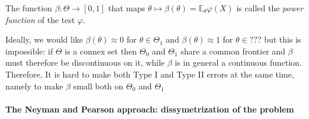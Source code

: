\documentclass[
	fontsize=11pt, %
	twoside=false, %
	numbers=noenddot, %
]{kaobook}
\newcommand{\E}{\mathbb E}
\newcommand{\goes}{\rightarrow}
\begin{document}
The function $\beta : \Theta \goes [0, 1]$ that maps $\theta \mapsto \beta(\theta) = \E_\theta \varphi(X)$ is called the \emph{power function} of the test $\varphi$.

Ideally, we would like $\beta(\theta) \approx 0$ for $\theta \in \Theta_1$ and $\beta(\theta) \approx 1$ for $\theta \in ???$  but this is impossible: if $\Theta$ is a connex set then $\Theta_0$ and $\Theta_1$ share a common frontier and $\beta$ must therefore be discontinuous on it, while $\beta$ is in general a continuous function.
Therefore, It is hard to make both Type I and Type II errors at the same time, namely to make $\beta$ small both on $\Theta_0$ and $\Theta_1$

\paragraph{The Neyman and Pearson approach: dissymetrization of the problem} %
\label{par:paragraph_name}




\end{document}
